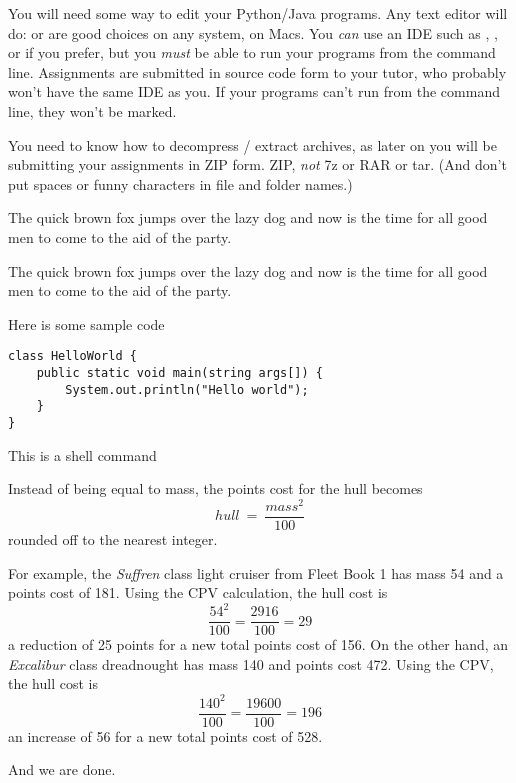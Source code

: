 You will need some way to edit your Python/Java programs. Any text editor will do:
 or  are good choices on any system,  on
Macs. You \emph{can} use an IDE such as , , or 
if you prefer, but you \emph{must} be able to run your programs from the command line.
Assignments are submitted in source code form to your tutor, who probably won't have
the same IDE as you. If your programs can't run from the command line, they won't be
marked.

You need to know how to decompress / extract  archives, as later on you will
be submitting your assignments in ZIP form. ZIP, \emph{not} 7z or RAR or tar.
(And don't put spaces or funny characters in file and folder names.)



\DOT The quick brown fox jumps over the lazy dog and now is the time for all good men to come
to the aid of the party.


\begin{IMPORTANT}
The quick brown fox jumps over the lazy dog and now is the time for all good men to come
to the aid of the party.
\end{IMPORTANT}

Here is some sample code

\begin{CODE}\begin{verbatim}
class HelloWorld {
    public static void main(string args[]) {
        System.out.println("Hello world");
    }
}
\end{verbatim}\end{CODE}

This is a shell command



Instead of being equal to mass, the points cost for the hull becomes
\[ hull\ =\ \frac{mass^{2}} {100} \]
rounded off to the nearest integer.

For example, the \emph{Suffren} class light cruiser from Fleet Book 1
has mass 54 and a points cost of 181. Using the CPV calculation, the hull cost is
\[ \frac{54^{2}}{100} = \frac{2916}{100} = 29 \]
a reduction of 25 points for a new total points cost of 156. On the
other hand, an \emph{Excalibur} class dreadnought has mass 140 and points cost
472. Using the CPV, the hull cost is
\[ \frac{140^{2}}{100} = \frac{19600}{100} = 196 \]
an increase of 56 for a new total points
cost of 528.


And we are done.


